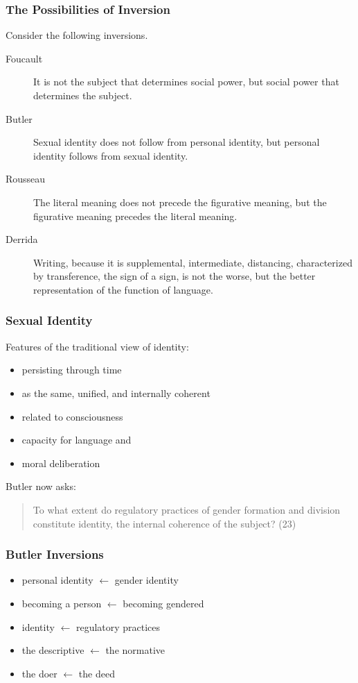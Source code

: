 \documentclass[xcolor=dvipsnames]{beamer}
\begin{document}
\begin{frame}
  \frametitle{The Possibilities of Inversion}
  Consider the following inversions.
  \begin{description}
  \item[Foucault] It is not the subject that determines social power,
    but social power that determines the subject.
  \item[Butler] Sexual identity does not follow from personal
    identity, but personal identity follows from sexual identity.
  \item[Rousseau] The literal meaning does not precede the figurative
    meaning, but the figurative meaning precedes the literal meaning.
  \item[Derrida] Writing, because it is supplemental, intermediate,
    distancing, characterized by transference, the sign of a sign, is
    not the worse, but the better representation of the function of
    language.
  \end{description}
\end{frame}

\begin{frame}
  \frametitle{Sexual Identity}
  Features of the traditional view of identity:
  \begin{itemize}
  \item persisting through time
  \item as the same, unified, and internally coherent
  \item related to consciousness
  \item capacity for language and
  \item moral deliberation
  \end{itemize}
Butler now asks:
\begin{quote}
  To what extent do regulatory practices of gender formation and
  division constitute identity, the internal coherence of the subject?
  (23)
\end{quote}
\end{frame}

\begin{frame}
  \frametitle{Butler Inversions}
  \begin{itemize}
  \item personal identity $\longleftarrow$ gender identity
  \item becoming a person $\longleftarrow$ becoming gendered
  \item identity $\longleftarrow$ regulatory practices
  \item the descriptive $\longleftarrow$ the normative
  \item the doer $\longleftarrow$ the deed
  \end{itemize}
\end{frame}
\end{document}
